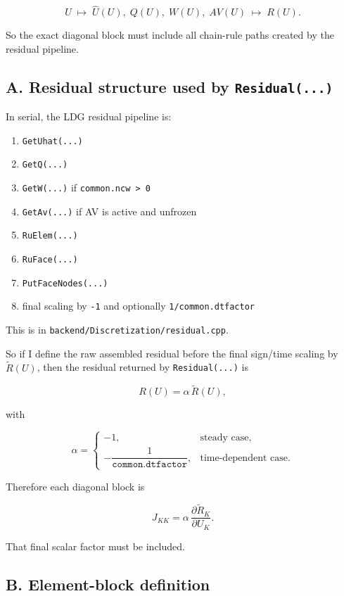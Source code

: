 \documentclass[11pt]{article}
\begin{document}
\[
U \;\longmapsto\; \hat U(U), \; Q(U), \; W(U), \; AV(U) \;\longmapsto\; R(U).
\]

So the exact diagonal block must include all chain-rule paths created by the
residual pipeline.

\subsection*{A. Residual structure used by \texttt{Residual(...)}}

In serial, the LDG residual pipeline is:

\begin{enumerate}[leftmargin=*]
\item \texttt{GetUhat(...)}
\item \texttt{GetQ(...)}
\item \texttt{GetW(...)} if \texttt{common.ncw > 0}
\item \texttt{GetAv(...)} if AV is active and unfrozen
\item \texttt{RuElem(...)}
\item \texttt{RuFace(...)}
\item \texttt{PutFaceNodes(...)}
\item final scaling by \texttt{-1} and optionally \texttt{1/common.dtfactor}
\end{enumerate}

This is in \texttt{backend/Discretization/residual.cpp}.

So if I define the raw assembled residual before the final sign/time scaling by
$\widetilde R(U)$, then the residual returned by \texttt{Residual(...)} is

\[
R(U) = \alpha \, \widetilde R(U),
\]

with

\[
\alpha =
\begin{cases}
-1, & \text{steady case},\\[4pt]
-\dfrac{1}{\texttt{common.dtfactor}}, & \text{time-dependent case}.
\end{cases}
\]

Therefore each diagonal block is

\[
J_{KK} = \alpha \, \frac{\partial \widetilde R_K}{\partial U_K}.
\]

That final scalar factor must be included.

\subsection*{B. Element-block definition}
\end{document}
